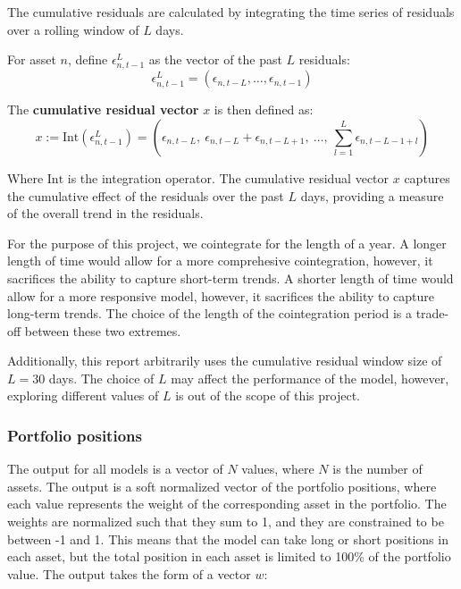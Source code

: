 \documentclass[12pt]{article}
\begin{document}
The cumulative residuals are calculated by integrating the time series of residuals over a rolling window of $L$ days.

For asset $n$, define $\epsilon^L_{n,t-1}$ as the vector of the past $L$ residuals:
\begin{equation}
    \epsilon^L_{n,t-1} = (\epsilon_{n,t-L}, \ldots, \epsilon_{n,t-1})
    \label{eq:residual_vector}
\end{equation}

The \textbf{cumulative residual vector} $x$ is then defined as:
\begin{equation}
    x := \mathrm{Int}(\epsilon^L_{n,t-1}) 
      = \left( \epsilon_{n,t-L},\ \epsilon_{n,t-L} + \epsilon_{n,t-L+1},\ \ldots,\ \sum_{l=1}^{L} \epsilon_{n,t-L-1+l} \right)
    \label{eq:cumulative_residual}
\end{equation}

Where $\mathrm{Int}$ is the integration operator. The cumulative residual vector $x$ captures the cumulative effect of the residuals over the past $L$ days, providing a measure of the overall trend in the residuals.

For the purpose of this project, we cointegrate for the length of a year. A longer length of time would allow for a more comprehesive cointegration, however, it sacrifices the ability to capture short-term trends. A shorter length of time would allow for a more responsive model, however, it sacrifices the ability to capture long-term trends. The choice of the length of the cointegration period is a trade-off between these two extremes.

Additionally, this report arbitrarily uses the cumulative residual window size of $L=30$ days. The choice of $L$ may affect the performance of the model, however, exploring different values of $L$ is out of the scope of this project.

\subsubsection{Portfolio positions}

The output for all models is a vector of $N$ values, where $N$ is the number of assets. The output is a soft normalized vector of the portfolio positions, where each value represents the weight of the corresponding asset in the portfolio. The weights are normalized such that they sum to 1, and they are constrained to be between -1 and 1. This means that the model can take long or short positions in each asset, but the total position in each asset is limited to 100\% of the portfolio value. The output takes the form of a vector $w$:
\end{document}
